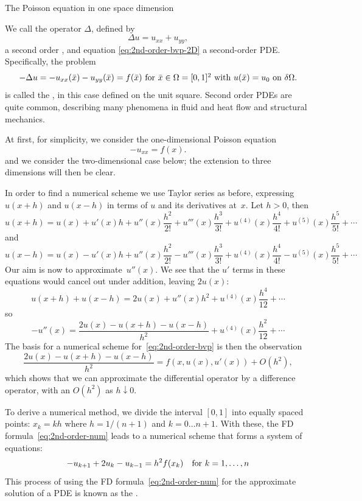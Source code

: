  {The Poisson equation in one space dimension}
\label{sec:poisson}
\label{sec:1dbvp}

We call the operator $\Delta$, defined by
\[ \Delta u = u_{xx}+u_{yy}, \]
a second order , and equation
\eqref{eq:2nd-order-bvp-2D} a second-order
\ac{PDE}. Specifically, the problem
\begin{equation}
 \hbox{$-\Delta u = -u_{xx}(\bar x)-u_{yy}(\bar x)=f(\bar x)$ for
   $\bar x\in\Omega=[0,1]^2$ 
    with $u(\bar x)=u_0$ on $\delta\Omega$.}
 \label{eq:2nd-order-bvp-poisson}
 \end{equation}
is called the , in this case defined on
the unit square.
Second order \acp{PDE} are quite common, describing many phenomena in
fluid and heat flow and structural mechanics.

At first, for simplicity, we consider the one-dimensional Poisson
equation
\[ -u_{xx}=f(x). 
\]
and we consider the two-dimensional case below; the extension to three
dimensions will then be clear.

In order to find a numerical scheme we use Taylor series as before,
expressing $u(x+h)$ and $u(x-h)$ in terms of $u$ and its derivatives
at~$x$. Let $h>0$, then
\[ u(x+h)=u(x)+u'(x)h+u''(x)\frac{h^2}{2!}+u'''(x)\frac{h^3}{3!}
+u^{(4)}(x)\frac{h^4}{4!}+u^{(5)}(x)\frac{h^5}{5!}+\cdots \]
and
\[ u(x-h)=u(x)-u'(x)h+u''(x)\frac{h^2}{2!}-u'''(x)\frac{h^3}{3!}
+u^{(4)}(x)\frac{h^4}{4!}-u^{(5)}(x)\frac{h^5}{5!}+\cdots \]
Our aim is now to approximate~$u''(x)$.
We see that the $u'$ terms in these equations would cancel out under
addition, leaving $2u(x)$:
\[
  u(x+h)+u(x-h)=2u(x)+u''(x)h^2+u^{(4)}(x)\frac{h^4}{12}+\cdots
\]
so
\begin{equation}
 -u''(x)=\frac{2u(x)-u(x+h)-u(x-h)}{h^2}+u^{(4)}(x)\frac{h^2}{12}+\cdots
    \label{eq:2nd-order-num}\end{equation}
The basis for a numerical scheme for~\eqref{eq:2nd-order-bvp} is then
the observation
\[ \frac{2u(x)-u(x+h)-u(x-h)}{h^2}=f(x,u(x),u'(x))+O(h^2), \]
which shows that we can approximate the differential operator by a
difference operator, with an $O(h^2)$ 
as $h\downarrow0$.

To derive a numerical method,
we divide the interval $[0,1]$ into equally spaced points: $x_k=kh$
where $h=1/(n+1)$ and $k=0\ldots n+1$. With these, the \ac{FD}
formula~\eqref{eq:2nd-order-num} leads to a numerical scheme that
forms a system of equations:
\begin{equation}
  \label{eq:2nddiff-formula}
   -u_{k+1}+2u_k-u_{k-1} = h^2 f(x_k)
  \quad\hbox{for $k=1,\ldots,n$} 
\end{equation}
This process of using the \ac{FD} formula~\eqref{eq:2nd-order-num}
for the approximate solution of a \ac{PDE} is known as the
.

